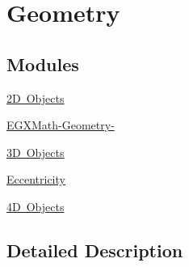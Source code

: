 \hypertarget{group___e_g_x_math-_geometry}{}\section{Geometry}
\label{group___e_g_x_math-_geometry}
\subsection*{Modules}
\begin{DoxyCompactItemize}
\item 
\mbox{\hyperlink{group___e_g_x_math-_geometry-2_d}{2\+D Objects}}
\item 
\mbox{\hyperlink{group___e_g_x_math-_geometry-}{E\+G\+X\+Math-\/\+Geometry-\/}}
\item 
\mbox{\hyperlink{group___e_g_x_math-_geometry-3_d}{3\+D Objects}}
\item 
\mbox{\hyperlink{group___e_g_x_math-_geometry-_eccentricity}{Eccentricity}}
\item 
\mbox{\hyperlink{group___e_g_x_math-_geometry-4_d}{4\+D Objects}}
\end{DoxyCompactItemize}


\subsection{Detailed Description}

